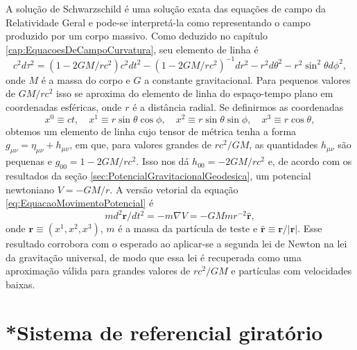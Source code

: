 A solução de Schwarzschild é uma solução exata das equações de campo da Relatividade Geral e pode-se interpretá-la como representando o campo produzido por um corpo massivo. Como deduzido no capítulo \ref{cap:EquacoesDeCampoCurvatura}, seu elemento de linha é
\[c^{2} d \tau^{2}=\left(1-2 G M / r c^{2}\right) c^{2} d t^{2}-\left(1-2 G M / r c^{2}\right)^{-1} d r^{2}-r^{2} d \theta^{2}-r^{2} \sin ^{2} \theta d \phi^{2},\]
onde $ M $ é a massa do corpo e $ G $ a constante gravitacional. Para pequenos valores de $ GM/rc^2 $ isso se aproxima do elemento de linha do espaço-tempo plano em coordenadas esféricas, onde $ r $ é a distância radial. Se definirmos as coordenadas
\[x^{0} \equiv c t, \quad x^{1} \equiv r \sin \theta \cos \phi, \quad x^{2} \equiv r \sin \theta \sin \phi, \quad x^{3} \equiv r \cos \theta,\]
obtemos um elemento de linha cujo tensor de métrica tenha a forma $ g_{\mu\nu} =\eta_{\mu \nu}+h_{\mu\nu} $, em que, para valores grandes de $ rc^2/GM $, as quantidades $ h_{\mu\nu} $ são pequenas e $ g_{00}=1-2GM/rc^2 $.  Isso nos dá $ h_{00} = -2GM/rc^2 $ e, de acordo com os resultados da seção \ref{sec:PotencialGravitacionalGeodesica}, um potencial newtoniano $ V = -GM/r $. A versão vetorial da equação \eqref{eq:EquacaoMovimentoPotencial} é 
\[
m d^{2} \mathbf{r} / d t^{2}=-m \nabla V=-G M m r^{-2} \hat{\mathbf{r}}
,\]
onde $ \mathbf{r} \equiv\left(x^{1}, x^{2}, x^{3}\right) $, $ m $ é a massa da partícula de teste e $ \hat{\mathbf{r}}\equiv \mathbf{r}/|\mathbf{r}| $. Esse resultado corrobora com o esperado ao aplicar-se a segunda lei de Newton na lei da gravitação universal, de modo que essa lei é recuperada como uma aproximação válida para grandes valores de $ rc^2/GM $ e partículas com velocidades baixas.



\section{*Sistema de referencial giratório}\label{sec:SistemaReferencialGiratorio}
